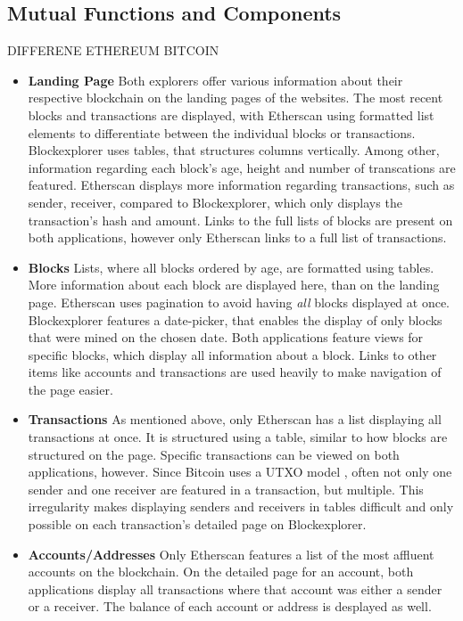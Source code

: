 \subsection{Mutual Functions and Components}
DIFFERENE ETHEREUM BITCOIN
\begin{itemize}
\item \textbf{Landing Page}
Both explorers offer various information about their respective blockchain on the landing pages of the websites. The most recent blocks and transactions are displayed, with Etherscan using formatted list elements to differentiate between the individual blocks or transactions. Blockexplorer uses tables, that structures columns vertically. Among other, information regarding each block's age, height and number of transcations are featured. Etherscan displays more information regarding transactions, such as sender, receiver, compared to Blockexplorer, which only displays the transaction's hash and amount. Links to the full lists of blocks are present on both applications, however only Etherscan links to a full list of transactions.
\item \textbf{Blocks}
Lists, where all blocks ordered by age, are formatted using tables. More information about each block are displayed here, than on the landing page. Etherscan uses pagination to avoid having \emph{all} blocks displayed at once. Blockexplorer features a date-picker, that enables the display of only blocks that were mined on the chosen date. Both applications feature views for specific blocks, which display all information about a block. Links to other items like accounts and transactions are used heavily to make navigation of the page easier.
\item \textbf{Transactions}
As mentioned above, only Etherscan has a list displaying all transactions at once. It is structured using a table, similar to how blocks are structured on the page. Specific transactions can be viewed on both applications, however. Since Bitcoin uses a UTXO model \cite{bitcoin}, often not only one sender and one receiver are featured in a transaction, but multiple. This irregularity makes displaying senders and receivers in tables difficult and only possible on each transaction's detailed page on Blockexplorer.
\item \textbf{Accounts/Addresses}
Only Etherscan features a list of the most affluent accounts on the blockchain. On the detailed page for an account, both applications display all transactions where that account was either a sender or a receiver. The balance of each account or address is desplayed as well.

\end{itemize}

